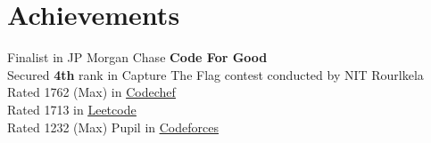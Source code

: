 %
\section{Achievements}
\begin{itemize}[leftmargin=0.15in, label={}]
  \small{\item{
        Finalist in JP Morgan Chase \textbf{Code For Good} \\
        Secured \textbf{4th} rank in Capture The Flag contest conducted by NIT Rourlkela \\
        Rated 1762 (Max) in \href{https://www.codechef.com/users/ashu2909}
        {\underline{Codechef}} \\
        {Rated 1713 in \href{https://leetcode.com/ashu_coderc/}{\underline{Leetcode}}} \\
        Rated 1232 (Max) Pupil in \href{https://codeforces.com/profile/ashucoder}
        {\underline{Codeforces}} \\
        }}


\end{itemize}